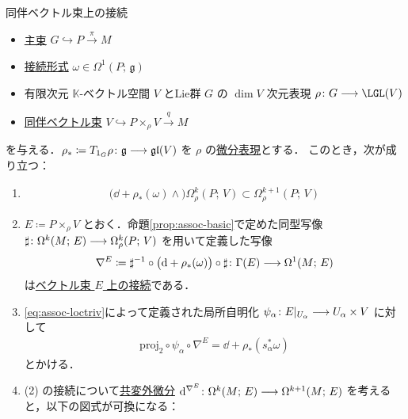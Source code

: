 \documentclass[TQFT_main]{subfiles}
\begin{document}
\begin{mytheo}[label=thm:connection-assoc,breakable]{同伴ベクトル束上の接続}
    \begin{itemize}
        \item \hyperref[def.PFD]{主束} $G \hookrightarrow P \xrightarrow{\pi} M$
        \item \hyperref[def:connection]{接続形式} $\omega \in \Omega^1(P;\, \mathfrak{g})$
        \item 有限次元 $\mathbb{K}$-ベクトル空間 $V$ とLie群 $G$ の $\dim V$ 次元表現 $\rho \colon G \lto \LGL (V)$ 
        \item \hyperref[def:associated-vect]{同伴ベクトル束} $V \hookrightarrow P \times_\rho V \xrightarrow{q} M$
    \end{itemize}
    を与える．$\rho_* \coloneqq T_{1_G} \rho \colon \mathfrak{g} \longrightarrow \mathfrak{gl}(V)$ を $\rho$ の\hyperref[def:diff-rep]{微分表現}とする．
    このとき，次が成り立つ：
    \begin{enumerate}
        \item \begin{align}
            \bigl(\dd + \rho_* (\omega) \wedge\bigr) \Omega^k_\rho(P;\, V) \subset \Omega^{k+1}_\rho (P;\, V)
        \end{align}
        \item $E \coloneqq P \times_\rho V$ とおく．命題\ref{prop:assoc-basic}で定めた同型写像 $\sharp \colon \Omega^k(M;\, E) \longrightarrow \Omega^k_\rho(P;\, V)$ を用いて定義した写像
        \begin{align}
            \nabla^E \coloneqq \sharp^{-1} \circ \bigl(\dd + \rho_*(\omega) \bigr) \circ \sharp\colon \Gamma(E) \longrightarrow \Omega^1(M;\, E)
        \end{align}
        は\hyperref[def:connection-vect]{ベクトル束 $E$ 上の接続}である．
        \item \eqref{eq:assoc-loctriv}によって定義された局所自明化 $\psi_\alpha \colon E|_{U_\alpha} \longrightarrow U_\alpha \times V$ に対して
        \begin{align}
            \mathrm{proj}_2 \circ \psi_\alpha \circ \nabla^E = \dd + \rho_* (s_\alpha^* \omega)
        \end{align}
        とかける．
        \item (2) の接続について\hyperref[def:connection-vect]{共変外微分} $\dd^{\nabla^E} \colon \Omega^k(M;\, E) \longrightarrow \Omega^{k+1}(M;\, E)$
        を考えると，以下の図式が可換になる：
        \begin{center}
        \end{center}
        
    \end{enumerate}
    
\end{mytheo}
\end{document}
